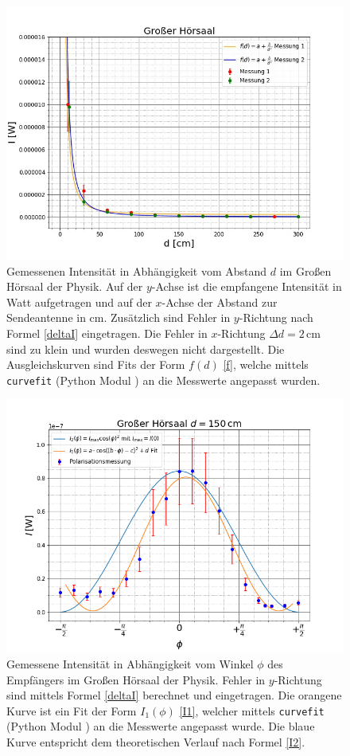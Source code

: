 \documentclass[titlepage,11pt,a4paper,ngerman]{article}
\begin{document}
\begin{figure}[ht]
	\centering
	\includegraphics[scale=0.55]{Bilder/bsp2}
	\caption{Gemessenen Intensität in Abhängigkeit vom Abstand $d$ im Großen Hörsaal der Physik. Auf der $y$-Achse ist die empfangene Intensität in Watt aufgetragen und auf der $x$-Achse der Abstand zur Sendeantenne in cm. Zusätzlich sind Fehler in $y$-Richtung nach Formel \eqref{deltaI} eingetragen. Die Fehler in $x$-Richtung $\Delta d = 2\,$cm sind zu klein und wurden deswegen nicht dargestellt. Die Ausgleichskurven sind Fits der Form $f(d)$ \eqref{f}, welche mittels \texttt{curvefit} (Python Modul \cite{curvescipy}) an die Messwerte angepasst wurden.}
	\label{Abstand-lin}
\end{figure}

\begin{figure}
	\centering
	\includegraphics[scale=0.55]{Bilder/Polarisation-GrH}
	\caption{Gemessene Intensität in Abhängigkeit vom Winkel $\phi$ des Empfängers im Großen Hörsaal der Physik. Fehler in $y$-Richtung sind mittels Formel \eqref{deltaI} berechnet und eingetragen. Die orangene Kurve ist ein Fit der Form $I_{1}(\phi)$ \eqref{I1}, welcher mittels \texttt{curvefit} (Python Modul \cite{curvescipy}) an die Messwerte angepasst wurde. Die blaue Kurve entspricht dem theoretischen Verlauf nach Formel \eqref{I2}.}
	\label{Labor-P}
\end{figure}
\end{document}
